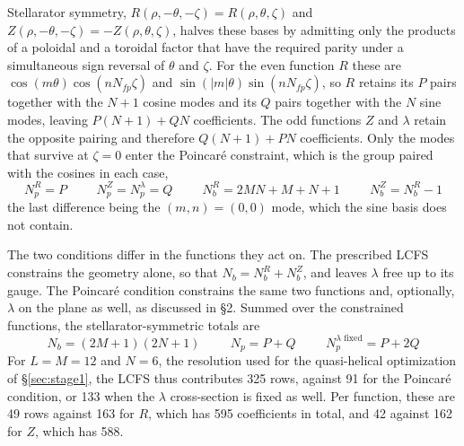 \documentclass{jpp}
\begin{document}
Stellarator symmetry, $R(\rho,-\theta,-\zeta)=R(\rho,\theta,\zeta)$ and $Z(\rho,-\theta,-\zeta)=-Z(\rho,\theta,\zeta)$, halves these bases by admitting only the products of a poloidal and a toroidal factor that have the required parity under a simultaneous sign reversal of $\theta$ and $\zeta$. For the even function $R$ these are $\cos(m\theta)\cos(nN_{fp}\zeta)$ and $\sin(|m|\theta)\sin(nN_{fp}\zeta)$, so $R$ retains its $P$ pairs together with the $N+1$ cosine modes and its $Q$ pairs together with the $N$ sine modes, leaving $P(N+1)+QN$ coefficients. The odd functions $Z$ and $\lambda$ retain the opposite pairing and therefore $Q(N+1)+PN$ coefficients. Only the modes that survive at $\zeta=0$ enter the Poincaré constraint, which is the group paired with the cosines in each case,
\begin{equation}
    N^R_p = P \hspace{1cm} N^Z_p = N^\lambda_p = Q \hspace{1cm} N^R_b = 2MN+M+N+1 \hspace{1cm} N^Z_b = N^R_b - 1
\end{equation}
the last difference being the $(m,n)=(0,0)$ mode, which the sine basis does not contain.

The two conditions differ in the functions they act on. The prescribed LCFS constrains the geometry alone, so that $N_b = N^R_b + N^Z_b$, and leaves $\lambda$ free up to its gauge. The Poincaré condition constrains the same two functions and, optionally, $\lambda$ on the plane as well, as discussed in \S2. Summed over the constrained functions, the stellarator-symmetric totals are
\begin{equation}
    N_b = (2M+1)(2N+1) \hspace{1cm} N_p = P + Q \hspace{1cm} N_p^{\lambda \text{ fixed}} = P + 2Q
\end{equation}
For $L=M=12$ and $N=6$, the resolution used for the quasi-helical optimization of \S\ref{sec:stage1}, the LCFS thus contributes 325 rows, against 91 for the Poincaré condition, or 133 when the $\lambda$ cross-section is fixed as well. Per function, these are 49 rows against 163 for $R$, which has 595 coefficients in total, and 42 against 162 for $Z$, which has 588.
\end{document}
